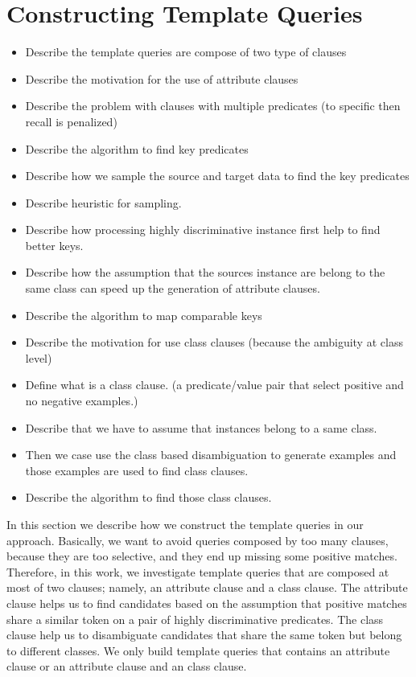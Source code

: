 \section{Constructing Template Queries}

\begin{itemize}

\item Describe the template queries are compose of two type of clauses
\item Describe the motivation for the use of attribute clauses
\item Describe the problem with clauses with multiple predicates (to specific then recall is penalized)
\item Describe the algorithm to find key predicates
\item Describe how we sample the source and target data to find the key predicates
\item Describe heuristic for sampling. 
\item Describe how processing highly discriminative instance first help to find better keys.
\item Describe how the assumption that the sources instance are belong to the same class can speed up the generation of attribute clauses.
\item Describe the algorithm to map comparable keys

\item Describe the motivation for use class clauses (because the ambiguity at class level)
\item Define what is a class clause. (a predicate/value pair that select positive and no negative examples.)
\item Describe that we have to assume that instances belong to a same class. 
\item Then we case use the class based disambiguation to generate examples and those examples are used to find class clauses.
\item Describe the algorithm to find those class clauses.

\end{itemize}

In this section we describe how we construct the template queries in our approach. Basically, we want to avoid queries composed by too many clauses, because they are too selective, and they end up missing some positive matches. Therefore, in this work, we investigate template queries that are composed at most of two clauses; namely, an attribute clause and a class clause. The attribute clause helps us to find candidates based on the assumption that positive matches share a similar token on a pair of highly discriminative predicates. The class clause help us to disambiguate candidates that share the same token but belong to different classes.  We only build template queries that contains an attribute clause or an attribute clause and an class clause. 

